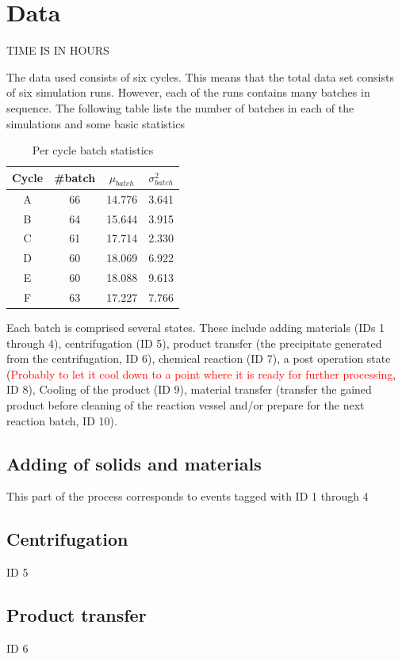 \documentclass[../Thesis.tex]{subfiles}
\begin{document}
\chapter{Data}
TIME IS IN HOURS

The data used consists of six cycles. This means that the total data set consists of six simulation runs. However, each of the runs contains many batches in sequence. The following table lists the number of batches in each of the simulations and some basic statistics

\begin{table}[h]
    \centering
    \begin{tabular}{c|c|c|c}
        Cycle & \#batch & $\mu_{batch}$ & $\sigma^2_{batch}$\\ \hline
        A & 66 & 14.776 & 3.641\\
        B & 64 & 15.644 & 3.915\\
        C & 61 & 17.714 & 2.330\\
        D & 60 & 18.069 & 6.922\\
        E & 60 & 18.088 & 9.613\\
        F & 63 & 17.227 & 7.766
    \end{tabular}
    \caption{Per cycle batch statistics}
    \label{tab:cycle basi stats}
\end{table}

Each batch is comprised several states. These include adding materials (IDs 1 through 4), centrifugation (ID 5), product transfer (the precipitate generated from the centrifugation, ID 6), chemical reaction (ID 7), a post operation state (\textcolor{red}{Probably to let it cool down to a point where it is ready for further processing}, ID 8), Cooling of the product (ID 9), material transfer (transfer the gained product before cleaning of the reaction vessel and/or prepare for the next reaction batch, ID 10).

\section{Adding of solids and materials}
This part of the process corresponds to events tagged with ID 1 through 4

\section{Centrifugation}
ID 5

\section{Product transfer}
ID 6
\end{document}
